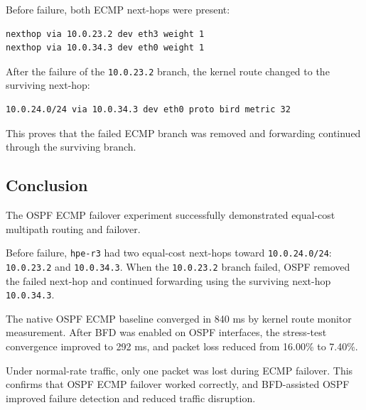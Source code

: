 Before failure, both ECMP next-hops were present:

\begin{verbatim}
nexthop via 10.0.23.2 dev eth3 weight 1
nexthop via 10.0.34.3 dev eth0 weight 1
\end{verbatim}

After the failure of the \texttt{10.0.23.2} branch, the kernel route changed to the surviving next-hop:

\begin{verbatim}
10.0.24.0/24 via 10.0.34.3 dev eth0 proto bird metric 32
\end{verbatim}

This proves that the failed ECMP branch was removed and forwarding continued through the surviving branch.

\subsection{Conclusion}

The OSPF ECMP failover experiment successfully demonstrated equal-cost multipath routing and failover.

Before failure, \texttt{hpe-r3} had two equal-cost next-hops toward \texttt{10.0.24.0/24}: \texttt{10.0.23.2} and \texttt{10.0.34.3}. When the \texttt{10.0.23.2} branch failed, OSPF removed the failed next-hop and continued forwarding using the surviving next-hop \texttt{10.0.34.3}.

The native OSPF ECMP baseline converged in 840 ms by kernel route monitor measurement. After BFD was enabled on OSPF interfaces, the stress-test convergence improved to 292 ms, and packet loss reduced from 16.00\% to 7.40\%.

Under normal-rate traffic, only one packet was lost during ECMP failover. This confirms that OSPF ECMP failover worked correctly, and BFD-assisted OSPF improved failure detection and reduced traffic disruption.
